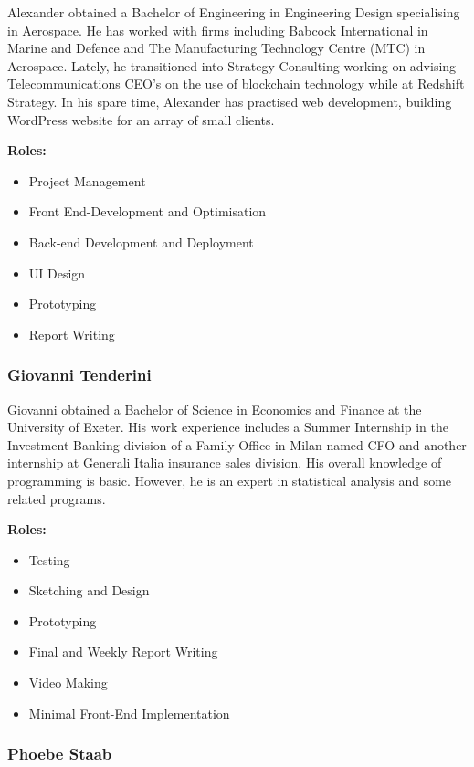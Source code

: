 \documentclass[fontsize=11pt]{extarticle}
\numberwithin{figure}{section} %
\numberwithin{table}{section}%
\providecommand{\tightlist}{%
  \setlength{\itemsep}{0pt}\setlength{\parskip}{0pt}}
\begin{document}
Alexander obtained a Bachelor of Engineering in Engineering Design
specialising in Aerospace. He has worked with firms including Babcock
International in Marine and Defence and The Manufacturing Technology
Centre (MTC) in Aerospace. Lately, he transitioned into Strategy
Consulting working on advising Telecommunications CEO's on the use of
blockchain technology while at Redshift Strategy. In his spare time,
Alexander has practised web development, building WordPress website for
an array of small clients.

\textbf{Roles:}

\begin{itemize}
\tightlist
\item
  Project Management
\item
  Front End-Development and Optimisation
\item
  Back-end Development and Deployment
\item
  UI Design
\item
  Prototyping
\item
  Report Writing
\end{itemize}

\hypertarget{giovanni-tenderini}{%
\subsubsection{Giovanni Tenderini}\label{giovanni-tenderini}}

Giovanni obtained a Bachelor of Science in Economics and Finance at the
University of Exeter. His work experience includes a Summer Internship
in the Investment Banking division of a Family Office in Milan named CFO
and another internship at Generali Italia insurance sales division. His
overall knowledge of programming is basic. However, he is an expert in
statistical analysis and some related programs.

\textbf{Roles:}

\begin{itemize}
\tightlist
\item
  Testing
\item
  Sketching and Design
\item
  Prototyping
\item
  Final and Weekly Report Writing
\item
  Video Making
\item
  Minimal Front-End Implementation
\end{itemize}

\hypertarget{phoebe-staab}{%
\subsubsection{Phoebe Staab}\label{phoebe-staab}}
\end{document}
